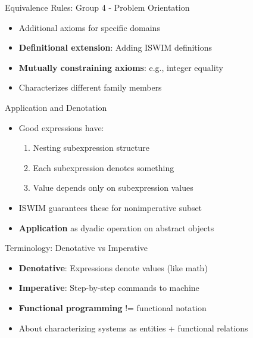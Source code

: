 \documentclass[10pt]{beamer}
\begin{document}
\begin{frame}{Equivalence Rules: Group 4 - Problem Orientation}
\begin{itemize}
\item Additional axioms for specific domains
\item \textbf{Definitional extension}: Adding ISWIM definitions
\item \textbf{Mutually constraining axioms}: e.g., integer equality
\item Characterizes different family members
\end{itemize}
\end{frame}

\begin{frame}{Application and Denotation}
\begin{itemize}
\item Good expressions have:
  \begin{enumerate}
  \item Nesting subexpression structure
  \item Each subexpression denotes something
  \item Value depends only on subexpression values
  \end{enumerate}
\item ISWIM guarantees these for nonimperative subset
\item \textbf{Application} as dyadic operation on abstract objects
\end{itemize}
\end{frame}

\begin{frame}{Terminology: Denotative vs Imperative}
\begin{itemize}
\item \textbf{Denotative}: Expressions denote values (like math)
\item \textbf{Imperative}: Step-by-step commands to machine
\item \textbf{Functional programming} {!=} functional notation
\item About characterizing systems as entities + functional relations
\end{itemize}
\end{frame}
\end{document}
